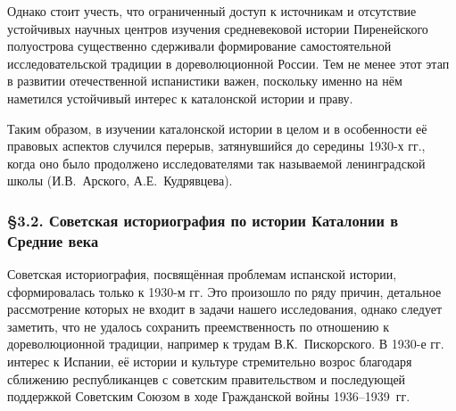 Однако стоит учесть, что ограниченный доступ к источникам и отсутствие устойчивых научных центров изучения средневековой истории Пиренейского полуострова существенно сдерживали формирование самостоятельной исследовательской традиции в дореволюционной России. Тем не менее этот этап в развитии отечественной испанистики важен, поскольку именно на нём наметился устойчивый интерес к каталонской истории и праву.

Таким образом, в изучении каталонской истории в целом и в особенности её правовых аспектов случился перерыв, затянувшийся до середины 1930-х гг., когда оно было продолжено исследователями так называемой ленинградской школы (И.В.~Арского, А.Е.~Кудрявцева).

\subsubsection*{§3.2. Советская историография по истории Каталонии в Средние века}

Советская историография, посвящённая проблемам испанской истории, сформировалась только к 1930-м гг. Это произошло по ряду причин, детальное рассмотрение которых не входит в задачи нашего исследования, однако следует заметить, что не удалось сохранить преемственность по отношению к дореволюционной традиции, например к трудам В.К.~Пискорского. В 1930-е гг. интерес к Испании, её истории и культуре стремительно возрос благодаря сближению республиканцев с советским правительством и последующей поддержкой Советским Союзом в ходе Гражданской войны 1936--1939~гг.

